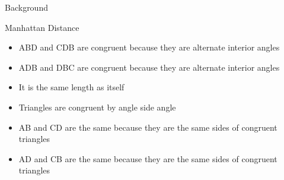 \documentclass{beamer}
\theoremstyle{case}
\begin{document}
\begin{section}{Background}
\begin{subsection}{Manhattan Distance}
\begin{frame}
{\begin{itemize}
            \item ABD and CDB are congruent because they are alternate interior angles
            \item ADB and DBC are congruent because they are alternate interior angles
            \item It is the same length as itself
            \item Triangles are congruent by angle side angle
            \item AB and CD are the same because they are the same sides of congruent triangles
            \item AD and CB are the same because they are the same sides of congruent triangles
        \end{itemize}
    }
\end{frame}


\end{subsection}
\end{section}
\end{document}
